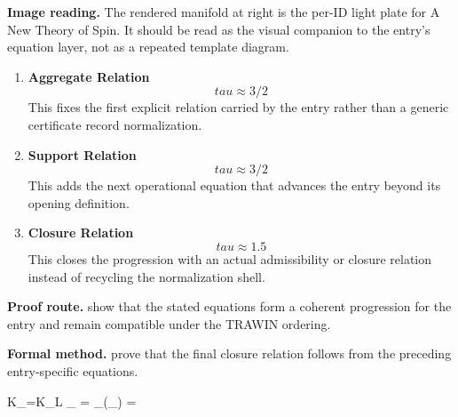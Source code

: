 \begin{samepage}
\noindent\begin{minipage}[t]{0.45\linewidth}
\vspace{0pt}
\raggedright
\scriptsize\textbf{Image reading.} The rendered manifold at right is the per-ID light plate for A New Theory of Spin. It should be read as the visual companion to the entry's equation layer, not as a repeated template diagram.\par
\end{minipage}\hfill
\begin{minipage}[t]{0.53\linewidth}
\vspace*{-0.10in}
\raggedright
{}
\end{minipage}
\end{samepage}

\clearpage


\begin{enumerate}[leftmargin=1.6em,itemsep=9pt,topsep=6pt]
\item \textbf{Aggregate Relation}
\[
tau \approx 3/2
\]
This fixes the first explicit relation carried by the entry rather than a generic certificate record normalization.

\item \textbf{Support Relation}
\[
tau \approx 3/2
\]
This adds the next operational equation that advances the entry beyond its opening definition.

\item \textbf{Closure Relation}
\[
tau \approx 1.5
\]
This closes the progression with an actual admissibility or closure relation instead of recycling the normalization shell.
\end{enumerate}

\textbf{Proof route.} show that the stated equations form a coherent progression for the entry and remain compatible under the TRAWIN ordering.

\textbf{Formal method.} prove that the final closure relation follows from the preceding entry-specific equations.

\medskip
{}

\begin{tzpsnapshot}
\end{tzpsnapshot}

\tzpequationlinks
  {K_{}=K_{L}}
  {_{} = \cdots}
  {_{}\!\left(_{}\right) = \cdots}
